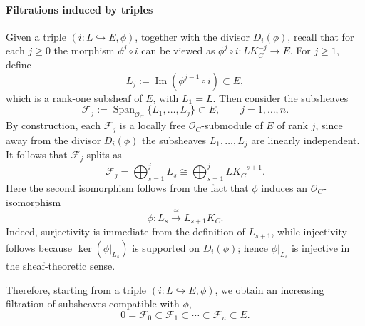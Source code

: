 \documentclass[twoside, 11pt]{article}
\numberwithin{equation}{section}
\theoremstyle{theorem}
\numberwithin{theorem}{section}
\theoremstyle{definition}
\begin{document}
\paragraph{Filtrations induced by triples}
Given a triple \((i:L\hookrightarrow E,\phi)\), together with the divisor \(D_i(\phi)\), recall that for each \(j\ge 0\) the morphism \(\phi^j\circ i\) can be viewed as
\(
\phi^j\circ i:L K_C^{-j}\longrightarrow E.
\)
For \(j\ge 1\), define
\[
L_j:=\operatorname{Im}(\phi^{j-1}\circ i)\subset E,
\]
which is a rank-one subsheaf of \(E\), with \(L_1=L\). Then consider the subsheaves
\[
\mathcal F_j:=\operatorname{Span}_{\mathcal O_C}\{L_1,\dots,L_j\}\subset E,\qquad j=1,\dots,n.
\]
By construction, each \(\mathcal F_j\) is a locally free \(\mathcal O_C\)-submodule of \(E\) of rank \(j\), since away from the divisor \(D_i(\phi)\) the subsheaves \(L_1,\dots,L_j\) are linearly independent. It follows that \(\mathcal F_j\) splits as
\begin{equation}\label{split-subbundle}
\mathcal F_j=\bigoplus_{s=1}^j L_s\cong \bigoplus_{s=1}^j LK_C^{-s+1}.
\end{equation}
Here the second isomorphism follows from the fact that \(\phi\) induces an \(\mathcal O_C\)-isomorphism
\begin{equation}\label{eqn-induced-graded-morphism}
\phi:L_s\xrightarrow{\ \cong\ }L_{s+1}K_C.
\end{equation}
Indeed, surjectivity is immediate from the definition of \(L_{s+1}\), while injectivity follows because \(\ker(\phi|_{L_s})\) is supported on \(D_i(\phi)\); hence \(\phi|_{L_s}\) is injective in the sheaf-theoretic sense.

Therefore, starting from a triple \((i:L\hookrightarrow E,\phi)\), we obtain an increasing filtration of subsheaves compatible with \(\phi\),
\begin{equation}\label{eqn-sheaves-filtration Higgs}
0=\mathcal F_0\subset \mathcal F_1\subset \cdots \subset \mathcal F_n\subset E.
\end{equation}
\end{document}
